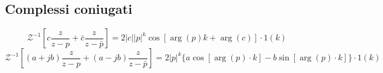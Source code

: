 \documentclass[11pt]{article}
\begin{document}
\subsection{Complessi coniugati}
\begin{displaymath}
    \mathcal{Z}^{-1}\left[c \frac{z}{z-p}+\bar{c} \frac{z}{z-\bar{p}}\right]=2|c||p|^{k} \cos [\arg (p) k+\arg (c)] \cdot 1(k)
\end{displaymath}
\begin{displaymath}
    \mathcal{Z}^{-1}\left[(a+j b) \frac{z}{z-p}+(a-j b) \frac{z}{z-\bar{p}}\right]=2|p|^{k}\{a \cos [\arg (p) \cdot k]-b \sin [\arg (p) \cdot k]\} \cdot 1(k)
\end{displaymath}
\end{document}
